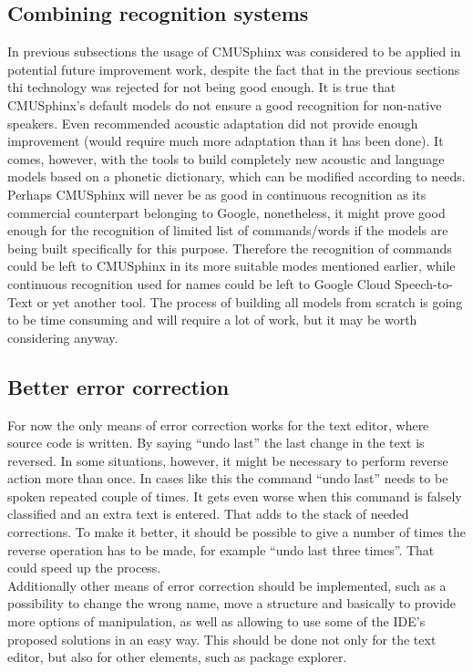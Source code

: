 \subsection{Combining recognition systems}
In previous subsections the usage of CMUSphinx was considered to be applied in potential future improvement work, despite the fact that in the previous sections thi technology was rejected for not being good enough. It is true that CMUSphinx's default models do not ensure a good recognition for non-native speakers. Even recommended acoustic adaptation did not provide enough improvement (would require much more adaptation than it has been done). It comes, however, with the tools to build completely new acoustic and language models based on a phonetic dictionary, which can be modified according to needs. Perhaps CMUSphinx will never be as good in continuous recognition as its commercial counterpart belonging to Google, nonetheless, it might prove good enough for the recognition of limited list of commands/words if the models are being built specifically for this purpose. Therefore the recognition of commands could be left to CMUSphinx in its more suitable modes mentioned earlier, while continuous recognition used \eg for names could be left to Google Cloud Speech-to-Text or yet another tool. The process of building all models from scratch is going to be time consuming and will require a lot of work, but it may be worth considering anyway. 

\subsection{Better error correction}
For now the only means of error correction works for the text editor, where source code is written. By saying ``undo last'' the last change in the text is reversed. In some situations, however, it might be necessary to perform reverse action more than once. In cases like this the command ``undo last'' needs to be spoken repeated couple of times. It gets even worse when this command is falsely classified and an extra text is entered. That adds to the stack of needed corrections. To make it better, it should be possible to give a number of times the reverse operation has to be made, for example ``undo last three times''. That could speed up the process. \\
Additionally other means of error correction should be implemented, such as a possibility to change the wrong name, move a structure and basically to provide more options of manipulation, as well as allowing to use some of the IDE's proposed solutions in an easy way. This should be done not only for the text editor, but also for other elements, such as package explorer. 

